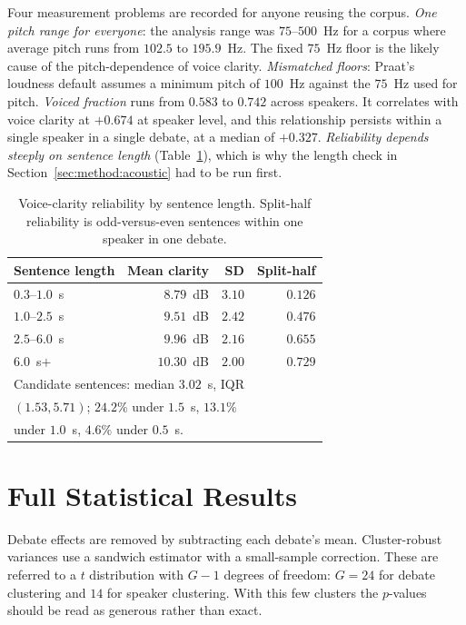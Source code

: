 \documentclass[pdflatex,sn-mathphys-num]{sn-jnl}%
\begin{document}
\begin{appendices}
Four measurement problems are recorded for anyone reusing the corpus.
\emph{One pitch range for everyone}: the analysis range was $75$--$500$~Hz
for a corpus where average pitch runs from $102.5$ to $195.9$~Hz. The
fixed $75$~Hz floor is the likely cause of the pitch-dependence of voice
clarity. \emph{Mismatched floors}: Praat's loudness default assumes a
minimum pitch of $100$~Hz against the $75$~Hz used for pitch. \emph{Voiced
fraction} runs from $0.583$ to $0.742$ across speakers. It correlates with
voice clarity at $+0.674$ at speaker level, and this relationship persists
within a single speaker in a single debate, at a median of $+0.327$. \emph{Reliability
depends steeply on sentence length} (Table~\ref{tab:reliab}), which is why
the length check in Section~\ref{sec:method:acoustic} had to be run first.

\begin{table}[h]
\caption{Voice-clarity reliability by sentence length. Split-half reliability
is odd-versus-even sentences within one speaker in one debate.}
\label{tab:reliab}
\centering
\begin{tabular}{lrrr}
\toprule
Sentence length & Mean clarity & SD & Split-half \\
\midrule
$0.3$--$1.0$~s  & $8.79$~dB  & $3.10$ & $0.126$ \\
$1.0$--$2.5$~s  & $9.51$~dB  & $2.42$ & $0.476$ \\
$2.5$--$6.0$~s  & $9.96$~dB  & $2.16$ & $0.655$ \\
$6.0$~s$+$      & $10.30$~dB & $2.00$ & $0.729$ \\
\midrule
\multicolumn{4}{l}{Candidate sentences: median $3.02$~s, IQR} \\
\multicolumn{4}{l}{$(1.53, 5.71)$; $24.2\%$ under $1.5$~s, $13.1\%$} \\
\multicolumn{4}{l}{under $1.0$~s, $4.6\%$ under $0.5$~s.} \\
\bottomrule
\end{tabular}
\end{table}

\section{Full Statistical Results}
\label{app:stats}

Debate effects are removed by subtracting each debate's mean. Cluster-robust
variances use a sandwich estimator with a small-sample correction. These are
referred to a $t$ distribution with $G-1$ degrees of freedom: $G = 24$ for
debate clustering and $14$ for speaker clustering. With this few clusters
the $p$-values should be read as generous rather than exact.


\end{appendices}
\end{document}
